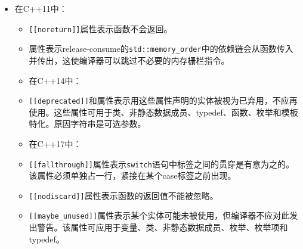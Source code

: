 \begin{itemize}
\item 在C++11中：



\begin{itemize}
\item \texttt{[[noreturn]]}属性表示函数不会返回。



\item {}属性表示release-consume的\texttt{std::\allowbreak{}memory\_\allowbreak{}order}中的依赖链会从函数传入并传出，这使编译器可以跳过不必要的内存栅栏指令。



\item 在C++14中：



\item \texttt{[[deprecated]]}和属性表示用这些属性声明的实体被视为已弃用，不应再使用。这些属性可用于类、非静态数据成员、typedef、函数、枚举和模板特化。原因字符串是可选参数。



\item 在C++17中：



\item \texttt{[[fallthrough]]}属性表示\texttt{switch}语句中标签之间的贯穿是有意为之的。该属性必须单独占一行，紧接在某个case标签之前出现。



\item \texttt{[[nodiscard]]}属性表示函数的返回值不能被忽略。



\item \texttt{[[maybe\_\allowbreak{}unused]]}属性表示某个实体可能未被使用，但编译器不应对此发出警告。该属性可应用于变量、类、非静态数据成员、枚举、枚举项和typedef。


\end{itemize}


\end{itemize}
